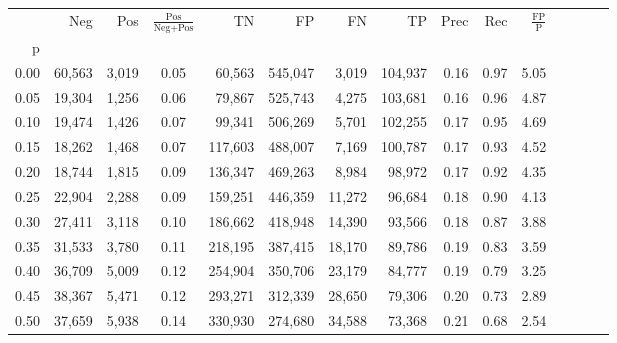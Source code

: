 \begin{tabular}{rrrcrrrrrrrrrrr}
\toprule
{} &     Neg &     Pos & $\frac{\text{Pos}}{\text{Neg}+\text{Pos}}$ &       TN &       FP &       FN &       TP &  Prec &   Rec & $\frac{\text{FP}}{\text{P}}$ \\
p    &         &         &                                            &          &          &          &          &       &       &                              \\
\midrule
0.00 &  60,563 &   3,019 &                                       0.05 &   60,563 &  545,047 &    3,019 &  104,937 &  0.16 &  0.97 &                         5.05 \\
0.05 &  19,304 &   1,256 &                                       0.06 &   79,867 &  525,743 &    4,275 &  103,681 &  0.16 &  0.96 &                         4.87 \\
0.10 &  19,474 &   1,426 &                                       0.07 &   99,341 &  506,269 &    5,701 &  102,255 &  0.17 &  0.95 &                         4.69 \\
0.15 &  18,262 &   1,468 &                                       0.07 &  117,603 &  488,007 &    7,169 &  100,787 &  0.17 &  0.93 &                         4.52 \\
0.20 &  18,744 &   1,815 &                                       0.09 &  136,347 &  469,263 &    8,984 &   98,972 &  0.17 &  0.92 &                         4.35 \\
0.25 &  22,904 &   2,288 &                                       0.09 &  159,251 &  446,359 &   11,272 &   96,684 &  0.18 &  0.90 &                         4.13 \\
0.30 &  27,411 &   3,118 &                                       0.10 &  186,662 &  418,948 &   14,390 &   93,566 &  0.18 &  0.87 &                         3.88 \\
0.35 &  31,533 &   3,780 &                                       0.11 &  218,195 &  387,415 &   18,170 &   89,786 &  0.19 &  0.83 &                         3.59 \\
0.40 &  36,709 &   5,009 &                                       0.12 &  254,904 &  350,706 &   23,179 &   84,777 &  0.19 &  0.79 &                         3.25 \\
0.45 &  38,367 &   5,471 &                                       0.12 &  293,271 &  312,339 &   28,650 &   79,306 &  0.20 &  0.73 &                         2.89 \\
0.50 &  37,659 &   5,938 &                                       0.14 &  330,930 &  274,680 &   34,588 &   73,368 &  0.21 &  0.68 &                         2.54 \\

\end{tabular}
